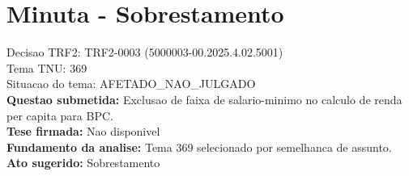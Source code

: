 \documentclass{article}
\begin{document}
\section*{Minuta - Sobrestamento}
Decisao TRF2: TRF2-0003 (5000003-00.2025.4.02.5001)\\
Tema TNU: 369\\
Situacao do tema: AFETADO\_NAO\_JULGADO\\
\textbf{Questao submetida:} Exclusao de faixa de salario-minimo no calculo de renda per capita para BPC.\\
\textbf{Tese firmada:} Nao disponivel\\
\textbf{Fundamento da analise:} Tema 369 selecionado por semelhanca de assunto.\\
\textbf{Ato sugerido:} Sobrestamento
\end{document}
